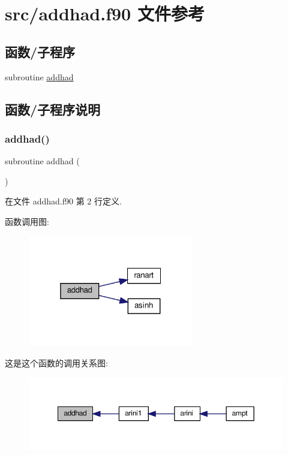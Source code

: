 \hypertarget{addhad_8f90}{}\section{src/addhad.f90 文件参考}
\label{addhad_8f90}
\subsection*{函数/子程序}
\begin{DoxyCompactItemize}
\item 
subroutine \mbox{\hyperlink{addhad_8f90_a3e102219839379c9ab7126c82783457c}{addhad}}
\end{DoxyCompactItemize}


\subsection{函数/子程序说明}
\mbox{\label{addhad_8f90_a3e102219839379c9ab7126c82783457c}} 
\subsubsection{\texorpdfstring{addhad()}{addhad()}}
{\footnotesize\ttfamily subroutine addhad (\begin{DoxyParamCaption}{ }\end{DoxyParamCaption})}



在文件 addhad.\+f90 第 2 行定义.

函数调用图\+:
\nopagebreak
\begin{figure}[H]
\begin{center}
\leavevmode
\includegraphics[width=205pt]{addhad_8f90_a3e102219839379c9ab7126c82783457c_cgraph}
\end{center}
\end{figure}
这是这个函数的调用关系图\+:
\nopagebreak
\begin{figure}[H]
\begin{center}
\leavevmode
\includegraphics[width=349pt]{addhad_8f90_a3e102219839379c9ab7126c82783457c_icgraph}
\end{center}
\end{figure}
